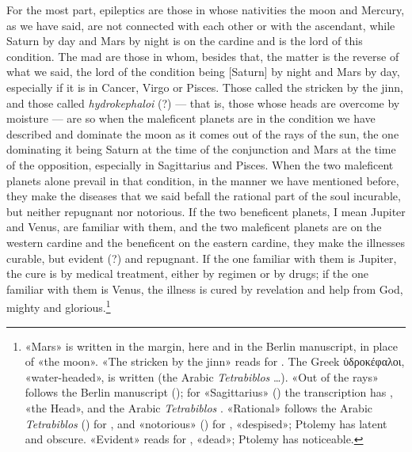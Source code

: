 \documentclass[11pt]{article}
\newcommand{\Fol}[1]{\marginpar{\footnotesize\color{gray}f.\,#1}}
\begin{document}
\par \Fol{62r}For the most part, epileptics are those in whose nativities the moon and Mercury, as we have said, are not connected with each other or with the ascendant, while Saturn by day and Mars by night is on the cardine and is the lord of this condition. The mad are those in whom, besides that, the matter is the reverse of what we said, the lord of the condition being [Saturn] by night and Mars by day, especially if it is in Cancer, Virgo or Pisces. Those called the stricken by the jinn, and those called \emph{hydrokephaloi} (?) — that is, those whose heads are overcome by moisture — are so when the maleficent planets are in the condition we have described and dominate the moon as it comes out of the rays of the sun, the one dominating it being Saturn at the time of the conjunction and Mars at the time of the opposition, especially in Sagittarius and Pisces. When the two maleficent planets alone prevail in that condition, in the manner we have mentioned before, they make the diseases that we said befall the rational part of the soul incurable, but neither repugnant nor notorious. If the two beneficent planets, I mean Jupiter and Venus, are familiar with them, and the two maleficent planets are on the western cardine and the beneficent on the eastern cardine, they make the illnesses curable, but evident (?) and repugnant. If the one familiar with them is Jupiter, the cure is by medical treatment, either by regimen or by drugs; if the one familiar with them is Venus, the illness is cured by revelation and help from God, mighty and glorious.\footnote{«Mars» is written in the margin, here and in the Berlin manuscript, in place of «the moon». «The stricken by the jinn» reads  for . The Greek ὑδροκέφαλοι, «water-headed», is written  (the Arabic \emph{Tetrabiblos} …). «Out of the rays» follows the Berlin manuscript (); for «Sagittarius» () the transcription has , «the Head», and the Arabic \emph{Tetrabiblos} . «Rational» follows the Arabic \emph{Tetrabiblos} () for , and «notorious» () for , «despised»; Ptolemy has latent and obscure. «Evident» reads  for , «dead»; Ptolemy has noticeable.}\par
\end{document}

